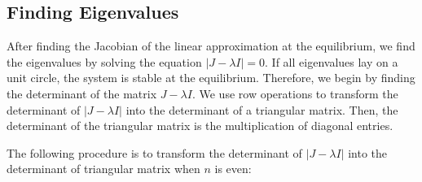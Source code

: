 \subsection{Finding Eigenvalues}
After finding the Jacobian of the linear approximation at the equilibrium, we find the eigenvalues by solving the equation $|J-\lambda I| = 0$. If all eigenvalues lay on a unit circle, the system is stable at the equilibrium. Therefore, we begin by finding the determinant of the matrix $J-\lambda I$. 
We use row operations to transform the determinant of $|J-\lambda I|$ into the determinant of a triangular matrix. Then, the determinant of the triangular matrix is the multiplication of diagonal entries. 

The following procedure is to transform the determinant of $|J-\lambda I|$ into the determinant of triangular matrix when $n$ is even:

